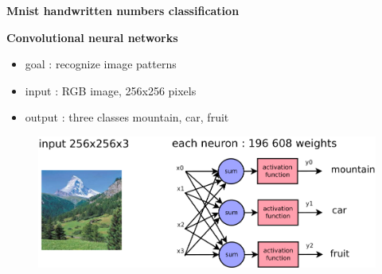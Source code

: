 \documentclass[xcolor=dvipsnames]{beamer}
\begin{document}
\begin{frame}{\bf Mnist handwritten numbers classification}
\begin{itemize}
\end{itemize}

\end{frame}


\begin{frame}{\bf Convolutional neural networks}

\begin{itemize}
    \item goal : recognize image patterns
    \item input   : RGB image, 256x256 pixels
    \item output   : three classes mountain, car, fruit
\end{itemize}

\begin{figure}
  \includegraphics[scale=0.35]{../../diagrams/nn/cnn_problem_1.png}
\end{figure}

\end{frame}
\end{document}
